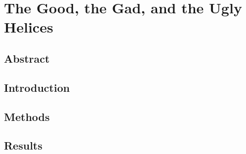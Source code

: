 
\chapter{The Good, the Gad, and the Ugly Helices} %
\section{Abstract}
\section{Introduction}
\section{Methods}
\section{Results}
